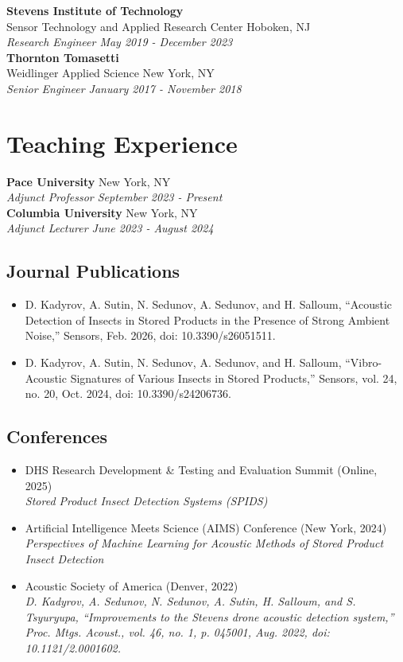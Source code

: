 \begin{singlespace}
\textbf{Stevens Institute of Technology}\\
Sensor Technology and Applied Research Center \hfill Hoboken, NJ \\
\textit{Research Engineer \hfill May 2019 - December 2023} \\

\textbf{Thornton Tomasetti}\\
Weidlinger Applied Science \hfill New York, NY \\
\textit{Senior Engineer \hfill January 2017 - November 2018} \\

\section*{Teaching Experience}
\textbf{Pace University} \hfill New York, NY \\
\textit{Adjunct Professor \hfill September 2023 - Present} \\

\textbf{Columbia University} \hfill New York, NY \\
\textit{Adjunct Lecturer \hfill June 2023 - August 2024} \\

\subsection*{Journal Publications}
\begin{itemize}
  \item D. Kadyrov, A. Sutin, N. Sedunov, A. Sedunov, and H. Salloum, “Acoustic Detection of Insects in Stored Products in the Presence of Strong Ambient Noise,” Sensors, Feb. 2026, doi: 10.3390/s26051511.
  \item D. Kadyrov, A. Sutin, N. Sedunov, A. Sedunov, and H. Salloum, “Vibro-Acoustic Signatures of Various Insects in Stored Products,” Sensors, vol. 24, no. 20, Oct. 2024, doi: 10.3390/s24206736.
\end{itemize}

\subsection*{Conferences}
\begin{itemize}
  \item DHS Research Development \& Testing and Evaluation Summit (Online, 2025)\\
  \textit{Stored Product Insect Detection Systems (SPIDS)}
  \item Artificial Intelligence Meets Science (AIMS) Conference (New York, 2024)\\
  \textit{Perspectives of Machine Learning for Acoustic Methods of Stored Product Insect Detection}
  \item Acoustic Society of America (Denver, 2022)\\
  \textit{D. Kadyrov, A. Sedunov, N. Sedunov, A. Sutin, H. Salloum, and S. Tsyuryupa, “Improvements to the Stevens drone acoustic detection system,” Proc. Mtgs. Acoust., vol. 46, no. 1, p. 045001, Aug. 2022, doi: 10.1121/2.0001602.}
\end{itemize}
\end{singlespace}

